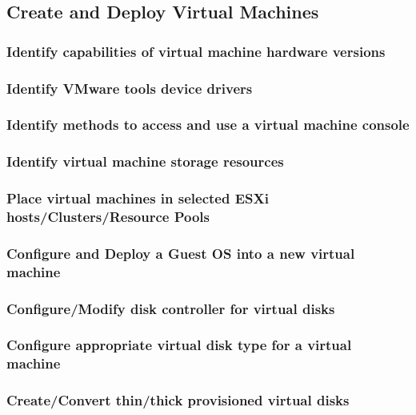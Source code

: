 \subsection{Create and Deploy Virtual Machines}

\subsubsection{Identify capabilities of virtual machine hardware versions}

\subsubsection{Identify VMware tools device drivers}

\subsubsection{Identify methods to access and use a virtual machine console}

\subsubsection{Identify virtual machine storage resources}

\subsubsection{Place virtual machines in selected ESXi hosts/Clusters/Resource Pools}

\subsubsection{Configure and Deploy a Guest OS into a new virtual machine}

\subsubsection{Configure/Modify disk controller for virtual disks}

\subsubsection{Configure appropriate virtual disk type for a virtual machine}

\subsubsection{Create/Convert thin/thick provisioned virtual disks}

